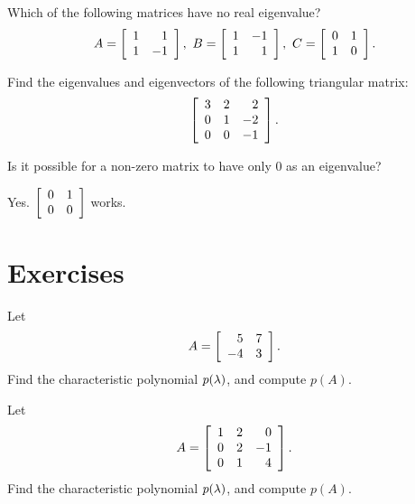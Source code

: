 \documentclass{ximera}
\begin{document}
\begin{exercise}
  Which of the following matrices have no real eigenvalue?
  \begin{equation*}
    A = \startmat{rr}
      1 & 1 \\
      1 & -1 \\
    \stopmat,
    \quad
    B = \startmat{rr}
      1 & -1 \\
      1 & 1 \\
    \stopmat,
    \quad
    C = \startmat{rr}
      0 & 1 \\
      1 & 0 \\
    \stopmat.
  \end{equation*}
\end{exercise}

\begin{exercise}
  Find the eigenvalues and eigenvectors of the following triangular
  matrix:
  \begin{equation*}
    \startmat{rrr}
      3 & 2 & 2 \\
      0 & 1 & -2 \\
      0 & 0 & -1 \\
    \stopmat.
  \end{equation*}
\end{exercise}

\begin{exercise}
  Is it possible for a non-zero matrix to have only $0$ as an eigenvalue?
  \vspace{1mm}
  \begin{solution}
    Yes. $\startmat{cc}
      0 & 1 \\
      0 & 0
    \stopmat$ works.
  \end{solution}
\end{exercise}

\section*{Exercises}

\begin{exercise}
  Let
  \begin{equation*}
    A = \startmat{rr}
      5 & 7 \\
      -4 & 3 \\
    \stopmat.
  \end{equation*}
  Find the characteristic polynomial $p(\eigenvar)$, and compute
  $p(A)$.
\end{exercise}

\begin{exercise}
  Let
  \begin{equation*}
    A = \startmat{rrr}
      1 & 2 & 0 \\
      0 & 2 & -1 \\
      0 & 1 & 4 \\
    \stopmat.
  \end{equation*}
  Find the characteristic polynomial $p(\eigenvar)$, and compute
  $p(A)$.
\end{exercise}
\end{document}

